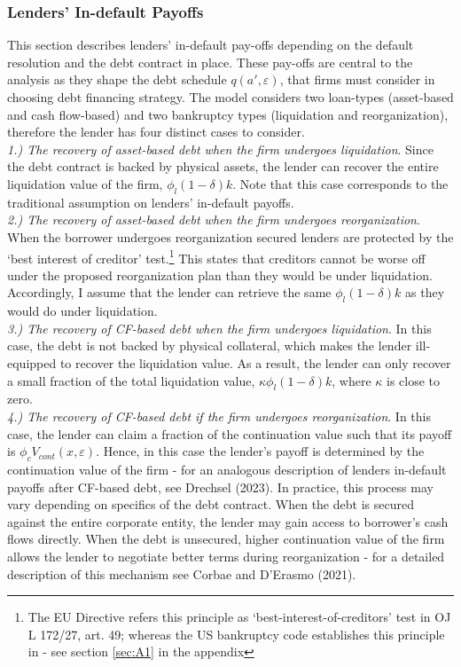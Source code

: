 \documentclass[12pt]{article}
\begin{document}
\subsubsection{Lenders' In-default Payoffs}   \label{sec:Default Payoffs}
This section describes lenders' in-default pay-offs depending on the default resolution and the debt contract in place. These pay-offs are central to the analysis as they shape the debt schedule $q(a', \varepsilon)$, that firms must consider in choosing debt financing strategy. The model considers two loan-types (asset-based and cash flow-based) and two bankruptcy types (liquidation and reorganization), therefore the lender has four distinct cases to consider. \vspace{3mm} \\
\textit{ 1.) The recovery of asset-based debt when the firm undergoes liquidation}. Since the debt contract is backed by physical assets, the lender can recover the entire liquidation value of the firm, $\phi_l(1-\delta)k$. Note that this case corresponds to the traditional assumption on lenders' in-default payoffs.  \vspace{3mm} \\
\textit{ 2.) The recovery of asset-based debt when the firm undergoes reorganization}. When the borrower undergoes reorganization secured lenders are protected by the ‘best interest of creditor’ test.\footnote{The EU Directive refers this principle as ‘best-interest-of-creditors’ test in OJ L 172/27, art. 49; whereas the US bankruptcy code establishes this principle in - see section \ref{sec:A1} in the appendix} This states that creditors cannot be worse off under the proposed reorganization plan than they would be under liquidation. Accordingly, I assume that the lender can retrieve the same $\phi_l(1-\delta)k$ as they would do under liquidation. \vspace{3mm} \\
\textit{ 3.) The recovery of CF-based debt when the firm undergoes liquidation}. In this case, the debt is not backed by physical collateral, which makes the lender ill-equipped to recover the liquidation value.  As a result, the lender can only recover a small fraction of the total liquidation value, $\kappa \phi_l(1-\delta)k$, where $\kappa$ is close to zero. \vspace{3mm} \\
\textit{ 4.) The recovery of CF-based debt if the firm undergoes reorganization}. In this case, the lender can claim a fraction of the continuation value such that its payoff is $\phi_c V_{cont}(x,\varepsilon)$. Hence, in this case the lender's payoff is determined by the continuation value of the firm - for an analogous description of lenders in-default payoffs after CF-based debt, see Drechsel (2023). In practice, this process may vary depending on specifics of the debt contract. When the debt is secured against the entire corporate entity, the lender may gain access to borrower's cash flows directly. When the debt is unsecured, higher continuation value of the firm allows the lender to negotiate better terms during reorganization - for a detailed description of this mechanism see Corbae and D'Erasmo (2021). \vspace{3mm} \\
\end{document}

